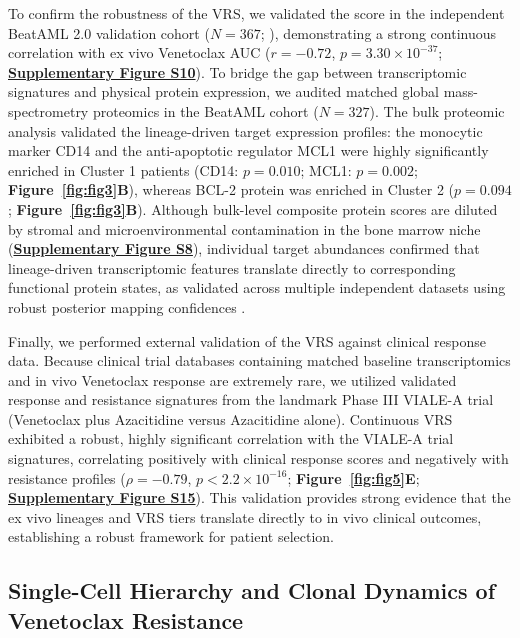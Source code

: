\documentclass[11pt,a4paper]{article}
\begin{document}
To confirm the robustness of the VRS, we validated the score in the independent BeatAML 2.0 validation cohort ($N=367$; \cite{bottomly2022,bottomly2022beataml}), demonstrating a strong continuous correlation with ex vivo Venetoclax AUC ($r=-0.72$, $p=3.30\times10^{-37}$; \textbf{\href{Supplementary_Methods.pdf}{\textbf{Supplementary Figure S10}}}). To bridge the gap between transcriptomic signatures and physical protein expression, we audited matched global mass-spectrometry proteomics in the BeatAML cohort ($N=327$). The bulk proteomic analysis validated the lineage-driven target expression profiles: the monocytic marker CD14 and the anti-apoptotic regulator MCL1 were highly significantly enriched in Cluster 1 patients (CD14: $p=0.010$; MCL1: $p=0.002$; \textbf{Figure~\ref{fig:fig3}B}), whereas BCL-2 protein was enriched in Cluster 2 ($p=0.094$; \textbf{Figure~\ref{fig:fig3}B}). Although bulk-level composite protein scores are diluted by stromal and microenvironmental contamination in the bone marrow niche (\textbf{\href{Supplementary_Methods.pdf}{\textbf{Supplementary Figure S8}}}), individual target abundances confirmed that lineage-driven transcriptomic features translate directly to corresponding functional protein states, as validated across multiple independent datasets using robust posterior mapping confidences \cite{pino2024mapping}.

Finally, we performed external validation of the VRS against clinical response data. Because clinical trial databases containing matched baseline transcriptomics and in vivo Venetoclax response are extremely rare, we utilized validated response and resistance signatures from the landmark Phase III VIALE-A trial (Venetoclax plus Azacitidine versus Azacitidine alone). Continuous VRS exhibited a robust, highly significant correlation with the VIALE-A trial signatures, correlating positively with clinical response scores and negatively with resistance profiles ($\rho=-0.79$, $p<2.2\times10^{-16}$; \textbf{Figure~\ref{fig:fig5}E}; \textbf{\href{Supplementary_Methods.pdf}{\textbf{Supplementary Figure S15}}}). This validation provides strong evidence that the ex vivo lineages and VRS tiers translate directly to in vivo clinical outcomes, establishing a robust framework for patient selection.


\subsection{Single-Cell Hierarchy and Clonal Dynamics of Venetoclax Resistance}
\end{document}
